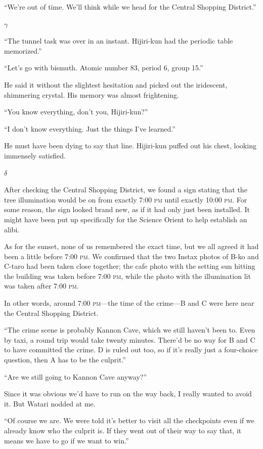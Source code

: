 \documentclass[
    a4paper,
    12pt,
    twoside,
    openany,
    UTF8,
    fontset=windows
]{ctexbook}
\begin{document}
``We're out of time. We'll think while we head for the Central Shopping District.''

$\gamma$

``The tunnel task was over in an instant. Hijiri-kun had the periodic table memorized.''

``Let's go with bismuth. Atomic number 83, period 6, group 15.''

He said it without the slightest hesitation and picked out the iridescent, shimmering crystal. His memory was almost frightening.

``You know everything, don't you, Hijiri-kun?''

``I don't know everything. Just the things I've learned.''

He must have been dying to say that line. Hijiri-kun puffed out his chest, looking immensely satisfied.

$\delta$

After checking the Central Shopping District, we found a sign stating that the tree illumination would be on from exactly 7:00 \textsc{pm} until exactly 10:00 \textsc{pm}. For some reason, the sign looked brand new, as if it had only just been installed. It might have been put up specifically for the Science Orient to help establish an alibi.

As for the sunset, none of us remembered the exact time, but we all agreed it had been a little before 7:00 \textsc{pm}. We confirmed that the two Instax photos of B-ko and C-taro had been taken close together; the cafe photo with the setting sun hitting the building was taken before 7:00 \textsc{pm}, while the photo with the illumination lit was taken after 7:00 \textsc{pm}.

In other words, around 7:00 \textsc{pm}---the time of the crime---B and C were here near the Central Shopping District.

``The crime scene is probably Kannon Cave, which we still haven't been to. Even by taxi, a round trip would take twenty minutes. There'd be no way for B and C to have committed the crime. D is ruled out too, so if it's really just a four-choice question, then A has to be the culprit.''

``Are we still going to Kannon Cave anyway?''

Since it was obvious we'd have to run on the way back, I really wanted to avoid it. But Watari nodded at me.

``Of course we are. We were told it's better to visit all the checkpoints even if we already know who the culprit is. If they went out of their way to say that, it means we have to go if we want to win.''
\end{document}
